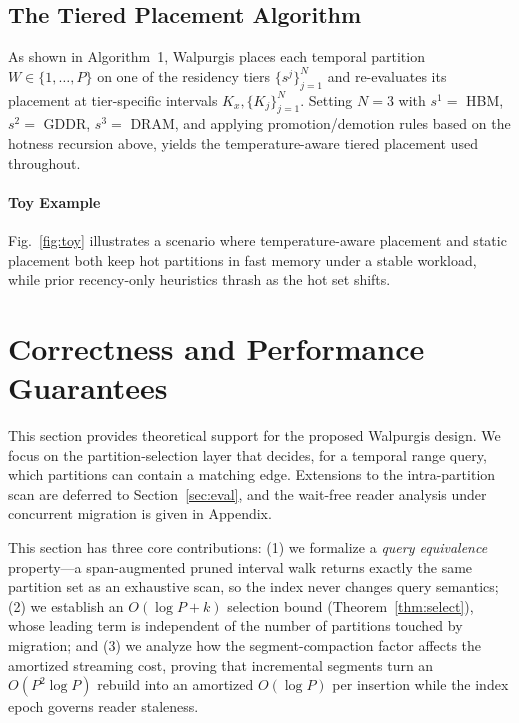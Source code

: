 \documentclass{article}
\begin{document}
\subsection{The Tiered Placement Algorithm}
\label{sec:system_algorithm}

As shown in Algorithm~1, Walpurgis places each temporal partition
$W \in \{1,\dots,P\}$ on one of the residency tiers $\{s^j\}_{j=1}^N$ and re-evaluates
its placement at tier-specific intervals $K_x, \{K_j\}_{j=1}^N$. Setting $N = 3$ with
$s^1 = $ HBM, $s^2 = $ GDDR, $s^3 = $ DRAM, and applying promotion/demotion rules
based on the hotness recursion above, yields the temperature-aware tiered placement
used throughout.

\paragraph{Toy Example} Fig.~\ref{fig:toy} illustrates a scenario where
temperature-aware placement and static placement both keep hot partitions in fast
memory under a stable workload, while prior recency-only heuristics thrash as the hot
set shifts.

\section{Correctness and Performance Guarantees}
\label{sec:guarantees}

This section provides theoretical support for the proposed Walpurgis design. We
focus on the partition-selection layer that decides, for a temporal range query,
which partitions can contain a matching edge. Extensions to the intra-partition
scan are deferred to Section~\ref{sec:eval}, and the wait-free reader analysis under
concurrent migration is given in Appendix.

This section has three core contributions: (1) we formalize a \emph{query equivalence}
property---a span-augmented pruned interval walk returns exactly the same partition
set as an exhaustive scan, so the index never changes query semantics; (2) we
establish an $O(\log P + k)$ selection bound (Theorem~\ref{thm:select}), whose leading
term is independent of the number of partitions touched by migration; and (3) we
analyze how the segment-compaction factor affects the amortized streaming cost,
proving that incremental segments turn an $O(P^2 \log P)$ rebuild into an amortized
$O(\log P)$ per insertion while the index epoch governs reader staleness.
\end{document}
